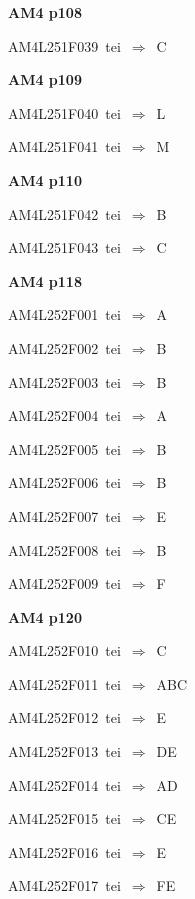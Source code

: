 \par\vfill\eject
{\bf\hfill AM4 p108\hfill\hbox{}}\par\bigskip
{\sixrm AM4L251F039\ {\sixit tei}\ }$\Rightarrow$\ {\tenit C}\par\smallskip

\par\vfill\eject
{\bf\hfill AM4 p109\hfill\hbox{}}\par\bigskip
{\sixrm AM4L251F040\ {\sixit tei}\ }$\Rightarrow$\ {\tenit L}\par\smallskip
{\sixrm AM4L251F041\ {\sixit tei}\ }$\Rightarrow$\ {\tenit M}\par\smallskip

\par\vfill\eject
{\bf\hfill AM4 p110\hfill\hbox{}}\par\bigskip
{\sixrm AM4L251F042\ {\sixit tei}\ }$\Rightarrow$\ {\tenit B}\par\smallskip
{\sixrm AM4L251F043\ {\sixit tei}\ }$\Rightarrow$\ {\tenit C}\par\smallskip

\par\vfill\eject
{\bf\hfill AM4 p118\hfill\hbox{}}\par\bigskip
{\sixrm AM4L252F001\ {\sixit tei}\ }$\Rightarrow$\ A\par\smallskip
{\sixrm AM4L252F002\ {\sixit tei}\ }$\Rightarrow$\ B\par\smallskip
{\sixrm AM4L252F003\ {\sixit tei}\ }$\Rightarrow$\ B\par\smallskip
{\sixrm AM4L252F004\ {\sixit tei}\ }$\Rightarrow$\ A\par\smallskip
{\sixrm AM4L252F005\ {\sixit tei}\ }$\Rightarrow$\ B\par\smallskip
{\sixrm AM4L252F006\ {\sixit tei}\ }$\Rightarrow$\ B\par\smallskip
{\sixrm AM4L252F007\ {\sixit tei}\ }$\Rightarrow$\ E\par\smallskip
{\sixrm AM4L252F008\ {\sixit tei}\ }$\Rightarrow$\ B\par\smallskip
{\sixrm AM4L252F009\ {\sixit tei}\ }$\Rightarrow$\ F\par\smallskip

\par\vfill\eject
{\bf\hfill AM4 p120\hfill\hbox{}}\par\bigskip
{\sixrm AM4L252F010\ {\sixit tei}\ }$\Rightarrow$\ C\par\smallskip
{\sixrm AM4L252F011\ {\sixit tei}\ }$\Rightarrow$\ ABC\par\smallskip
{\sixrm AM4L252F012\ {\sixit tei}\ }$\Rightarrow$\ E\par\smallskip
{\sixrm AM4L252F013\ {\sixit tei}\ }$\Rightarrow$\ DE\par\smallskip
{\sixrm AM4L252F014\ {\sixit tei}\ }$\Rightarrow$\ AD\par\smallskip
{\sixrm AM4L252F015\ {\sixit tei}\ }$\Rightarrow$\ CE\par\smallskip
{\sixrm AM4L252F016\ {\sixit tei}\ }$\Rightarrow$\ E\par\smallskip
{\sixrm AM4L252F017\ {\sixit tei}\ }$\Rightarrow$\ FE\par\smallskip


